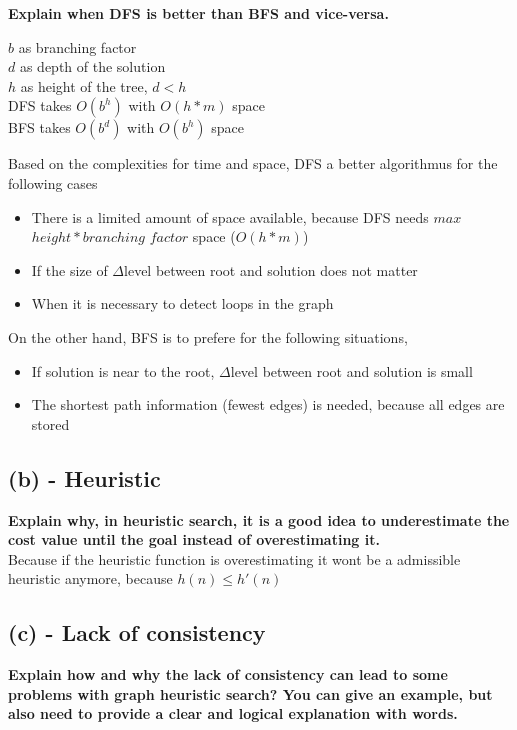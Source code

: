\documentclass{article}
\begin{document}
\begin{spacing}{1.2}
\textbf{Explain when DFS is better than BFS and vice-versa.}
\begin{center}
$b$ as branching factor\\
$d$ as depth of the solution\\
$h$ as height of the tree, $d<h$\\
DFS takes $O(b^h)$ with $O(h*m)$ space\\
BFS takes $O(b^d)$ with $O(b^h)$ space\\
\end{center}

Based on the complexities for time and space, DFS a better algorithmus for the following cases

\begin{itemize}
\item There is a limited amount of space available, because DFS needs $max$ $height * branching$ $factor$ space ($O(h*m)$)
\item If the size of $\Delta$level between root and solution does not matter
\item When it is necessary to detect loops in the graph
\end{itemize}

On the other hand, BFS is to prefere for the following situations, 
\begin{itemize}
\item If solution is near to the root,  $\Delta$level between root and solution is small
\item The shortest path information (fewest edges) is needed, because all edges are stored
\end{itemize}

\subsection{(b) - Heuristic}

\textbf{Explain why, in heuristic search, it is a good idea to underestimate the cost value until the goal
instead of overestimating it.}\\
Because if the heuristic function is overestimating it wont be a admissible heuristic anymore, because $h(n)\leq h'(n)$ 

\subsection{(c) - Lack of consistency }

\textbf{Explain how and why the lack of consistency can lead to some problems with graph heuristic
search? You can give an example, but also need to provide a clear and logical explanation with
words.}


\end{spacing}
\end{document}

